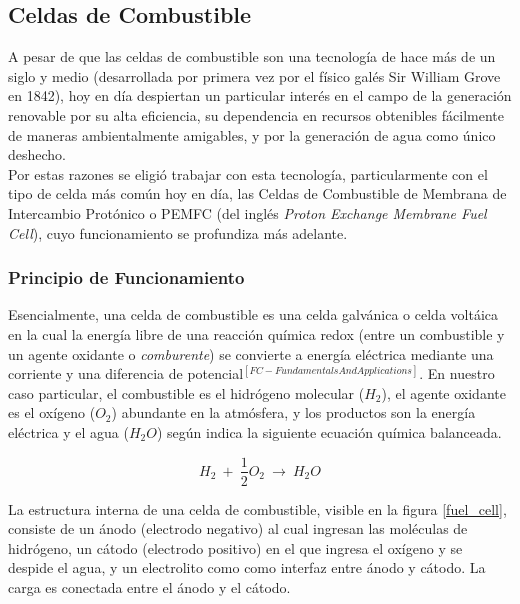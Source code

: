 \subsection{Celdas de Combustible}

A pesar de que las celdas de combustible son una tecnología de hace más de un siglo y medio (desarrollada por primera vez por el físico galés Sir William Grove en 1842), hoy en día despiertan un particular interés en el campo de la generación renovable por su alta eficiencia, su dependencia en recursos obtenibles fácilmente de maneras ambientalmente amigables, y por la generación de agua como único deshecho.\\

Por estas razones se eligió trabajar con esta tecnología, particularmente con el tipo de celda más común hoy en día, las Celdas de Combustible de Membrana de Intercambio Protónico o PEMFC (del inglés \textit{Proton Exchange Membrane Fuel Cell}), cuyo funcionamiento se profundiza más adelante.\\

\subsubsection{Principio de Funcionamiento}

Esencialmente, una celda de combustible es una celda galvánica o celda voltáica en la cual la energía libre de una reacción química redox (entre un combustible y un agente oxidante o \textit{comburente}) se convierte a energía eléctrica mediante una corriente y una diferencia de potencial$^{[FC-FundamentalsAndApplications]}$. En nuestro caso particular, el combustible es el hidrógeno molecular ($H_2$), el agente oxidante es el oxígeno ($O_2$) abundante en la atmósfera, y los productos son la energía eléctrica y el agua ($H_2O$) según indica la siguiente ecuación química balanceada.

\begin{equation}\label{redox_celda}
    H_2\ +\ \frac{1}{2}O_2\ \longrightarrow\ H_2O
\end{equation}

La estructura interna de una celda de combustible, visible en la figura \ref{fuel_cell}, consiste de un ánodo (electrodo negativo) al cual ingresan las moléculas de hidrógeno, un cátodo (electrodo positivo) en el que ingresa el oxígeno y se despide el agua, y un electrolito como como interfaz entre ánodo y cátodo. La carga es conectada entre el ánodo y el cátodo.

